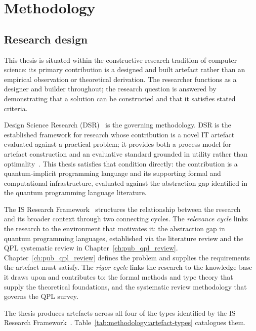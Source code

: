 \chapter{Methodology}\label{ch:methodology}

\section{Research design}\label{sec:methodology:design}
This thesis is situated within the constructive research tradition of computer science: its primary contribution is a designed and built artefact rather than an empirical observation or theoretical derivation.
The researcher functions as a designer and builder throughout; the research question is answered by demonstrating that a solution can be constructed and that it satisfies stated criteria.

Design Science Research (DSR)~\cite{Hevner2004DesignScienceIS} is the governing methodology.
DSR is the established framework for research whose contribution is a novel IT artefact evaluated against a practical problem; it provides both a process model for artefact construction and an evaluative standard grounded in utility rather than optimality~\cite{Hevner2004DesignScienceIS}.
This thesis satisfies that condition directly: the contribution is a quantum-implicit programming language and its supporting formal and computational infrastructure, evaluated against the abstraction gap identified in the quantum programming language literature.

The IS Research Framework~\cite{Hevner2004DesignScienceIS} structures the relationship between the research and its broader context through two connecting cycles.
The \textit{relevance cycle} links the research to the environment that motivates it: the abstraction gap in quantum programming languages, established via the literature review and the QPL systematic review in Chapter~\ref{ch:pub_qpl_review}.
Chapter~\ref{ch:pub_qpl_review} defines the problem and supplies the requirements the artefact must satisfy.
The \textit{rigor cycle} links the research to the knowledge base it draws upon and contributes to: the formal methods and type theory that supply the theoretical foundations, and the systematic review methodology that governs the QPL survey.

The thesis produces artefacts across all four of the types identified by the IS Research Framework~\cite{Hevner2004DesignScienceIS}.
Table~\ref{tab:methodology:artefact-types} catalogues them.

